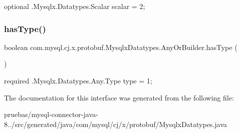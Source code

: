 {\ttfamily optional .Mysqlx.\+Datatypes.\+Scalar scalar = 2;} \mbox{\label{interfacecom_1_1mysql_1_1cj_1_1x_1_1protobuf_1_1_mysqlx_datatypes_1_1_any_or_builder_a432d597e73938ff5d3153af19dec1512}} 
\subsubsection{\texorpdfstring{has\+Type()}{hasType()}}
{\footnotesize\ttfamily boolean com.\+mysql.\+cj.\+x.\+protobuf.\+Mysqlx\+Datatypes.\+Any\+Or\+Builder.\+has\+Type (\begin{DoxyParamCaption}{ }\end{DoxyParamCaption})}

{\ttfamily required .Mysqlx.\+Datatypes.\+Any.\+Type type = 1;} 

The documentation for this interface was generated from the following file\+:\begin{DoxyCompactItemize}
\item 
pruebas/mysql-\/connector-\/java-\/8../src/generated/java/com/mysql/cj/x/protobuf/Mysqlx\+Datatypes.\+java\end{DoxyCompactItemize}
